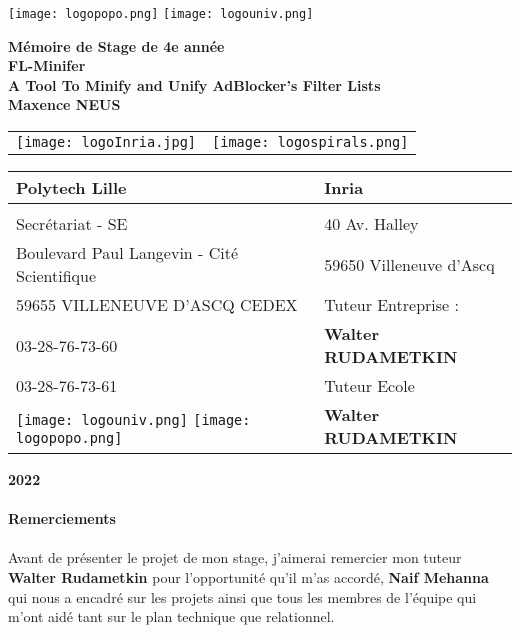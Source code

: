 \documentclass[oneside,a4paper,12pt]{article}
\begin{document}
	\begin{titlepage}
		\texttt{[image: logopopo.png]}
		\hspace*{\fill}
		\texttt{[image: logouniv.png]}
		
		\begin{center}
			\vspace{1cm}
			\textbf{Mémoire de Stage de 4e année}\\
			\vspace{1cm}
			\textbf{\LARGE FL-Minifer}\\
			\textbf{\large A Tool To Minify and Unify AdBlocker’s Filter Lists}\\
			\vspace{1cm}
			\textbf{Maxence NEUS}\\
			\vspace{1cm}
			\begin{tabular}{ c c }
				\texttt{[image: logoInria.jpg]} & \texttt{[image: logospirals.png]}\\
			\end{tabular}

			\vspace{2cm}

			\begin{tabular}{ m{6cm} | m{6cm} }
				\textbf{Polytech Lille} & \textbf{Inria} \\
				\hline
				& \\
				Secrétariat - SE & 40 Av. Halley \\
				Boulevard Paul Langevin - Cité Scientifique & 59650 Villeneuve d'Ascq \\
				59655 VILLENEUVE D’ASCQ CEDEX & Tuteur Entreprise : \\
				03-28-76-73-60 & \textbf{Walter RUDAMETKIN} \\
				03-28-76-73-61 & Tuteur Ecole \\
				\texttt{[image: logouniv.png]} \texttt{[image: logopopo.png]} & \textbf{Walter RUDAMETKIN} \\
				
			\end{tabular}
			
			\vspace{\fill}
			\textbf{2022}\\
		\end{center}
	\end{titlepage}

\tableofcontents


\vfill
\paragraph{Remerciements}\paragraph{}
Avant de présenter le projet de mon stage, j'aimerai remercier mon tuteur \textbf{Walter Rudametkin} pour l'opportunité qu'il m'as accordé, \textbf{Naif Mehanna} qui nous a encadré sur les projets ainsi que tous les membres de l'équipe qui m'ont aidé tant sur le plan technique que relationnel. 
\end{document}
